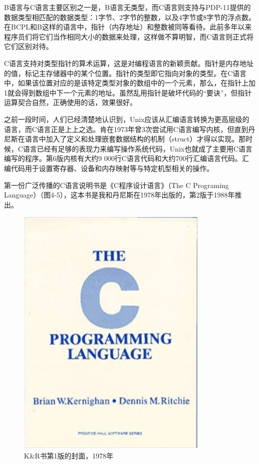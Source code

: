 \documentclass[a4paper,12pt,UTF8,twoside]{ctexbook}
\begin{document}
B语言与C语言主要区别之一是，B语言无类型，而C语言则支持与PDP-11提供的数据类型相匹配的数据类型：1字节、2字节的整数，以及4字节或8字节的浮点数。在BCPL和B这样的语言中，指针（内存地址）和整数被同等看待。此前多年以来程序员们将它们当作相同大小的数据来处理，这样做不算明智，而C语言则正式将它们区别对待。

C语言支持对类型指针的算术运算，这是对编程语言的新颖贡献。指针是内存地址的值，标记主存储器中的某个位置。指针的类型即它指向对象的类型。在C语言中，如果该位置对应的是该特定类型对象的数组中的一个元素，那么，在指针上加1就会得到数组中下一个元素的地址。虽然乱用指针是破坏代码的“要诀”，但指针运算契合自然，正确使用的话，效果很好。

之前一段时间，人们已经清楚地认识到，Unix应该从汇编语言转换为更高层级的语言，而C语言正是上上之选。肯在1973年曾3次尝试用C语言编写内核，但直到丹尼斯在语言中加入了定义和处理嵌套数据结构的机制（struct）才得以实现。那时候，C语言已经有足够的表现力来编写操作系统代码，Unix也就成了主要用C语言编写的程序。第6版内核有大约9 000行C语言代码和大约700行汇编语言代码。汇编代码用于设置寄存器、设备和内存映射等与特定机型相关的操作。

第一份广泛传播的C语言说明书是《C程序设计语言》（The C Programing Language）（图4-5），这本书是我和丹尼斯在1978年出版的，第2版于1988年推出。

\begin{figure}[htbp]
	\centering
	\includegraphics[width=0.7\linewidth]{38}
	\caption{K\&R书第1版的封面，1978年}
	\label{fig:1}
\end{figure}
\end{document}

